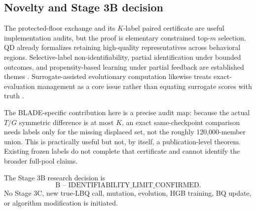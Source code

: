 \subsection{Novelty and Stage 3B decision}

The protected-floor exchange and its $K$-label paired certificate are useful
implementation audits, but the proof is elementary constrained top-$m$
selection.  QD already formalizes retaining high-quality representatives
across behavioral regions.  Selective-label non-identifiability, partial
identification under bounded outcomes, and propensity-based learning under
partial feedback are established themes
\cite{Lakkaraju2017,Manski2005,SwaminathanJoachims2015}.  Surrogate-assisted
evolutionary computation likewise treats exact-evaluation management as a
core issue rather than equating surrogate scores with truth \cite{Jin2011}.

The BLADE-specific contribution here is a precise audit map: because the
actual $T/G$ symmetric difference is at most $K$, an exact same-checkpoint
comparison needs labels only for the missing displaced set, not the roughly
120,000-member union.  This is practically useful but not, by itself, a
publication-level theorem.  Existing frozen labels do not complete that
certificate and cannot identify the broader full-pool claims.

The Stage 3B research decision is
\[
 \boxed{\text{B -- IDENTIFIABILITY\_LIMIT\_CONFIRMED}.}
\]
No Stage 3C, new true-LBQ call, mutation, evolution, HGB training, BQ update,
or algorithm modification is initiated.
